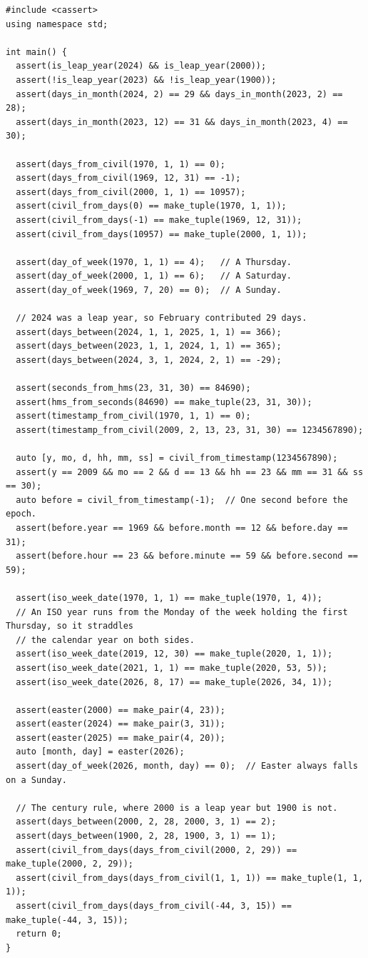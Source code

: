 \begin{lstlisting}[style=cpp]
#include <cassert>
using namespace std;

int main() {
  assert(is_leap_year(2024) && is_leap_year(2000));
  assert(!is_leap_year(2023) && !is_leap_year(1900));
  assert(days_in_month(2024, 2) == 29 && days_in_month(2023, 2) == 28);
  assert(days_in_month(2023, 12) == 31 && days_in_month(2023, 4) == 30);

  assert(days_from_civil(1970, 1, 1) == 0);
  assert(days_from_civil(1969, 12, 31) == -1);
  assert(days_from_civil(2000, 1, 1) == 10957);
  assert(civil_from_days(0) == make_tuple(1970, 1, 1));
  assert(civil_from_days(-1) == make_tuple(1969, 12, 31));
  assert(civil_from_days(10957) == make_tuple(2000, 1, 1));

  assert(day_of_week(1970, 1, 1) == 4);   // A Thursday.
  assert(day_of_week(2000, 1, 1) == 6);   // A Saturday.
  assert(day_of_week(1969, 7, 20) == 0);  // A Sunday.

  // 2024 was a leap year, so February contributed 29 days.
  assert(days_between(2024, 1, 1, 2025, 1, 1) == 366);
  assert(days_between(2023, 1, 1, 2024, 1, 1) == 365);
  assert(days_between(2024, 3, 1, 2024, 2, 1) == -29);

  assert(seconds_from_hms(23, 31, 30) == 84690);
  assert(hms_from_seconds(84690) == make_tuple(23, 31, 30));
  assert(timestamp_from_civil(1970, 1, 1) == 0);
  assert(timestamp_from_civil(2009, 2, 13, 23, 31, 30) == 1234567890);

  auto [y, mo, d, hh, mm, ss] = civil_from_timestamp(1234567890);
  assert(y == 2009 && mo == 2 && d == 13 && hh == 23 && mm == 31 && ss == 30);
  auto before = civil_from_timestamp(-1);  // One second before the epoch.
  assert(before.year == 1969 && before.month == 12 && before.day == 31);
  assert(before.hour == 23 && before.minute == 59 && before.second == 59);

  assert(iso_week_date(1970, 1, 1) == make_tuple(1970, 1, 4));
  // An ISO year runs from the Monday of the week holding the first Thursday, so it straddles
  // the calendar year on both sides.
  assert(iso_week_date(2019, 12, 30) == make_tuple(2020, 1, 1));
  assert(iso_week_date(2021, 1, 1) == make_tuple(2020, 53, 5));
  assert(iso_week_date(2026, 8, 17) == make_tuple(2026, 34, 1));

  assert(easter(2000) == make_pair(4, 23));
  assert(easter(2024) == make_pair(3, 31));
  assert(easter(2025) == make_pair(4, 20));
  auto [month, day] = easter(2026);
  assert(day_of_week(2026, month, day) == 0);  // Easter always falls on a Sunday.

  // The century rule, where 2000 is a leap year but 1900 is not.
  assert(days_between(2000, 2, 28, 2000, 3, 1) == 2);
  assert(days_between(1900, 2, 28, 1900, 3, 1) == 1);
  assert(civil_from_days(days_from_civil(2000, 2, 29)) == make_tuple(2000, 2, 29));
  assert(civil_from_days(days_from_civil(1, 1, 1)) == make_tuple(1, 1, 1));
  assert(civil_from_days(days_from_civil(-44, 3, 15)) == make_tuple(-44, 3, 15));
  return 0;
}
\end{lstlisting}

